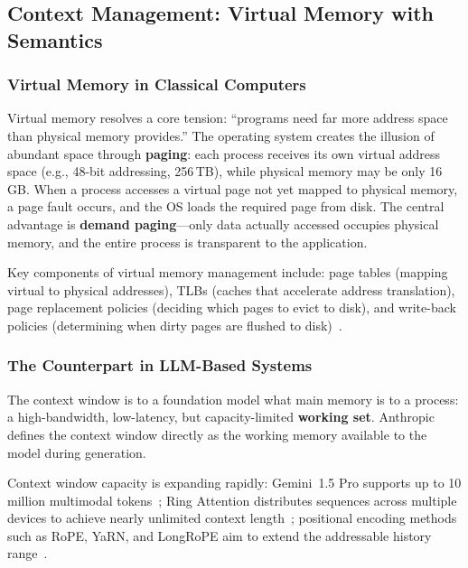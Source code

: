\documentclass[11pt,a4paper]{article}
\begin{document}
\subsection{Context Management: Virtual Memory with Semantics}
\label{sec:memory}

\subsubsection{Virtual Memory in Classical Computers}

Virtual memory resolves a core tension: ``programs need far more address space than physical memory provides.''
The operating system creates the illusion of abundant space through \textbf{paging}: each process receives its own virtual address space (e.g., 48-bit addressing, 256\,TB), while physical memory may be only 16\,GB.
When a process accesses a virtual page not yet mapped to physical memory, a page fault occurs, and the OS loads the required page from disk.
The central advantage is \textbf{demand paging}---only data actually accessed occupies physical memory, and the entire process is transparent to the application.

Key components of virtual memory management include: page tables (mapping virtual to physical addresses), TLBs (caches that accelerate address translation), page replacement policies (deciding which pages to evict to disk), and write-back policies (determining when dirty pages are flushed to disk)~\cite{ostep_2023}.

\subsubsection{The Counterpart in LLM-Based Systems}

The context window is to a foundation model what main memory is to a process: a high-bandwidth, low-latency, but capacity-limited \textbf{working set}.
Anthropic defines the context window directly as the working memory available to the model during generation.

Context window capacity is expanding rapidly: Gemini~1.5 Pro supports up to 10 million multimodal tokens~\cite{gemini2024}; Ring Attention distributes sequences across multiple devices to achieve nearly unlimited context length~\cite{liu2024ringattention}; positional encoding methods such as RoPE, YaRN, and LongRoPE aim to extend the addressable history range~\cite{su2021roformer,yarn2024,longrope2024}.
\end{document}
